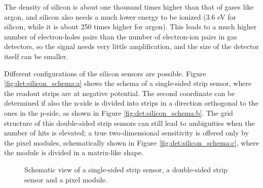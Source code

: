 The density of silicon is about one thousand times higher than that of gases like argon, and silicon also needs a much lower energy to be ionized (3.6 eV for silicon, while it is about 250 times higher for argon). This leads to a much higher number of electron-holes pairs than the number of electron-ion pairs in gas detectors, so the signal needs very little amplification, and the size of the detector itself can be smaller. 

Different configurations of the silicon sensors are possible. Figure \ref{fig:det:silicon_schema:a} shows the schema of a single-sided strip sensor, where the readout strips are at negative potential. The second coordinate can be determined if also the n-side is divided into strips in a direction orthogonal to the ones in the p-side, as shown in Figure \ref{fig:det:silicon_schema:b}. The grid structure of this double-sided strip sensors can still lead to ambiguities when the number of hits is elevated; a true two-dimensional sensitivity is offered only by the pixel modules, schematically shown in Figure \ref{fig:det:silicon_schema:c}, where the module is divided in a matrix-like shape.

\begin{figure}[ht]
\centering
{}
\caption{Schematic view of  a single-sided strip sensor,
 a double-sided strip sensor and  a pixel module. }
\label{fig:det:silicon_schema}
\end{figure}



